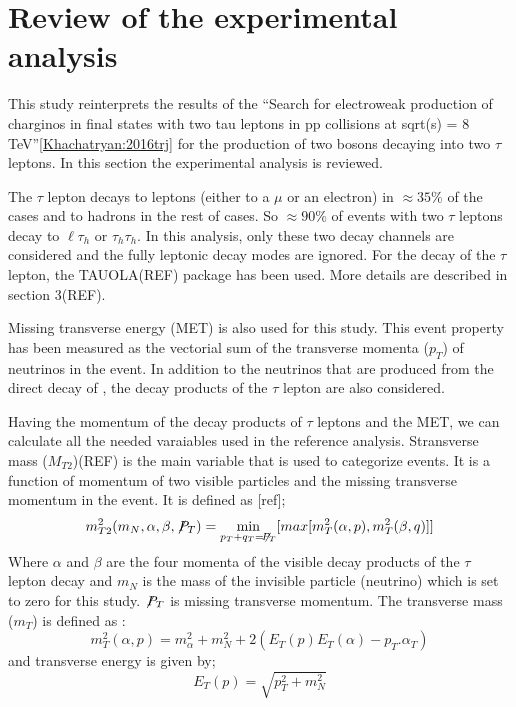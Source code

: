 \section{Review of the experimental analysis}


This study reinterprets the results of the ``Search for electroweak production of charginos in final states with two tau leptons in pp collisions at sqrt(s) = 8 TeV''\ref{Khachatryan:2016trj} for the production of two \wprime bosons decaying into two $\tau$ leptons. In this section the experimental analysis is reviewed.

The $\tau$ lepton decays to leptons (either to a $\mu$ or an electron) in $\approx 35\%$ of the cases and to hadrons in the rest of cases. So $\approx 90\%$ of events with two $\tau$ leptons decay to $\ell\tau_h$ or $\tau_h \tau_h$. In this analysis, only these two decay channels are considered and the fully leptonic decay modes are ignored. For the decay of the $\tau$ lepton, the TAUOLA(REF) package has been used. More details are described in section 3(REF).

Missing transverse energy (MET) is also used for this study. This event property has been measured as the vectorial sum of the transverse momenta ($p_{T}$) of neutrinos in the event. In addition to the neutrinos that are produced from the direct decay of \wprime, the decay products of the $\tau$ lepton are also considered. %

Having the momentum of the decay products of $\tau$ leptons and the MET, we can calculate all the needed varaiables used in the reference analysis. Stransverse mass ($M_{T2}$)(REF) is the main variable that is used to categorize events. It is a function of momentum of two visible particles and the missing transverse momentum in the event. It is defined as [ref];
\begin{equation}
m^2_{T2}(m_{N},\alpha,\beta,\not\!P_{T}) = \displaystyle\min_{p_T+q_T=\not\!P_T} [max[m^2_{T}(\alpha,p),m^2_{T}(\beta,q)]]
\end{equation}
Where $\alpha$ and $\beta$ are the four momenta of the visible decay products of the $\tau$ lepton decay and  $m_N$ is the mass of the invisible particle (neutrino) which is set to zero for this study. $\not\!P_T$ is missing transverse momentum. The transverse mass ($m_{T}$) is defined as :
\begin{equation}
m^2_{T}(\alpha,p) =  m^2_{\alpha}+m^2_N+2(E_T(p)E_T(\alpha)-p_T.\alpha_T)
\end{equation}
and transverse energy is given by; 
\begin{equation}
E_T(p)=\sqrt{p^2_T+m^2_N}
\end{equation}


